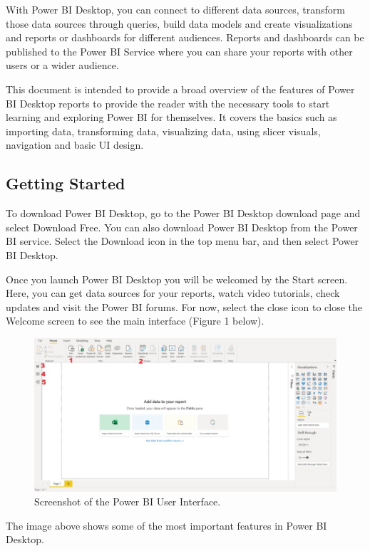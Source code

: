 \documentclass[
]{book}
\begin{document}
With Power BI Desktop, you can connect to different data sources, transform those data sources through queries, build data models and create visualizations and reports or dashboards for different audiences. Reports and dashboards can be published to the Power BI Service where you can share your reports with other users or a wider audience.

This document is intended to provide a broad overview of the features of Power BI Desktop reports to provide the reader with the necessary tools to start learning and exploring Power BI for themselves. It covers the basics such as importing data, transforming data, visualizing data, using slicer visuals, navigation and basic UI design.

\hypertarget{getting-started}{%
\subsection{Getting Started}\label{getting-started}}

To download Power BI Desktop, go to the Power BI Desktop download page and select Download Free. You can also download Power BI Desktop from the Power BI service. Select the Download icon in the top menu bar, and then select Power BI Desktop.

Once you launch Power BI Desktop you will be welcomed by the Start screen. Here, you can get data sources for your reports, watch video tutorials, check updates and visit the Power BI forums. For now, select the close icon to close the Welcome screen to see the main interface (Figure 1 below).

\begin{figure}
\centering
\includegraphics{bi1.jpg}
\caption{Screenshot of the Power BI User Interface.}
\end{figure}

The image above shows some of the most important features in Power BI Desktop.
\end{document}
